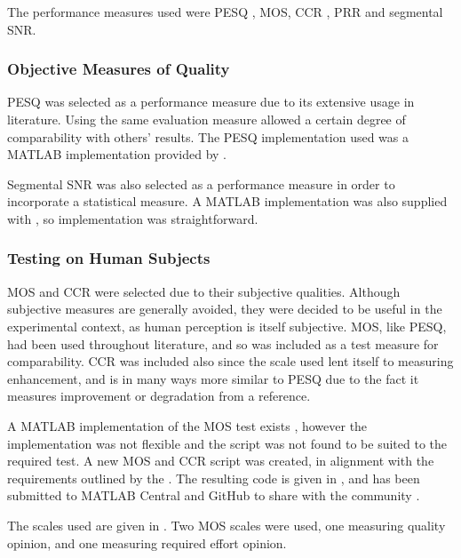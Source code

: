 The performance measures used were \ac{PESQ} \citep{InternationalTelecommunicationUnion2001},
\ac{MOS}, \ac{CCR} \citep{InternationalTelecommunicationUnion1996},
\ac{PRR} and segmental \ac{SNR}.


\subsubsection*{Objective Measures of Quality}

\ac{PESQ} was selected as a performance measure due to its extensive
usage in literature. Using the same evaluation measure allowed a certain
degree of comparability with others' results. The \ac{PESQ} implementation
used was a MATLAB implementation provided by \citet{Loizou2008}.

Segmental \ac{SNR} was also selected as a performance measure in
order to incorporate a statistical measure. A MATLAB implementation
was also supplied with \citep{Loizou2008}, so implementation was
straightforward.


\subsubsection*{Testing on Human Subjects}

\ac{MOS} and \ac{CCR} were selected due to their subjective qualities.
Although subjective measures are generally avoided, they were decided
to be useful in the experimental context, as human perception is itself
subjective. \ac{MOS}, like \ac{PESQ}, had been used throughout literature,
and so was included as a test measure for comparability. \ac{CCR}
was included also since the scale used lent itself to measuring enhancement,
and is in many ways more similar to \ac{PESQ} due to the fact it
measures improvement or degradation from a reference.

A MATLAB implementation of the \ac{MOS} test exists \citep{Ruzanski2009},
however the implementation was not flexible and the script was not
found to be suited to the required test. A new \ac{MOS} and \ac{CCR}
script was created, in alignment with the requirements outlined by
the \citet{InternationalTelecommunicationUnion1996}. The resulting
code is given in , and has been submitted
to MATLAB Central and GitHub to share with the community \citep{Gillman2014}.

The scales used are given in . Two \ac{MOS}
scales were used, one measuring quality opinion, and one measuring
required effort opinion.

